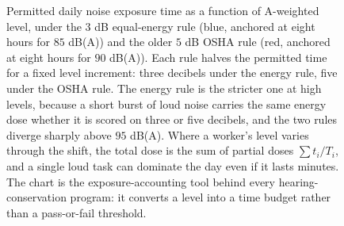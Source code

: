 \begin{figure}[htbp]
\centering
{}
\caption[Permitted exposure time under two exchange rules]{Permitted
daily noise exposure time as a function of A-weighted level, under the
$3$ dB equal-energy rule (blue, anchored at eight hours for
$85$ dB(A)) and the older $5$ dB OSHA rule (red, anchored at eight hours
for $90$ dB(A)). Each rule halves the permitted time for a fixed level
increment: three decibels under the energy rule, five under the OSHA
rule. The energy rule is the stricter one at high levels, because a
short burst of loud noise carries the same energy dose whether it is
scored on three or five decibels, and the two rules diverge sharply
above $95$ dB(A). Where a worker's level varies through the shift, the
total dose is the sum of partial doses $\sum t_i / T_i$, and a single
loud task can dominate the day even if it lasts minutes. The chart is
the exposure-accounting tool behind every hearing-conservation program:
it converts a level into a time budget rather than a pass-or-fail
threshold.}
\label{fig:vol03ch07:noise-dose}
\end{figure}
